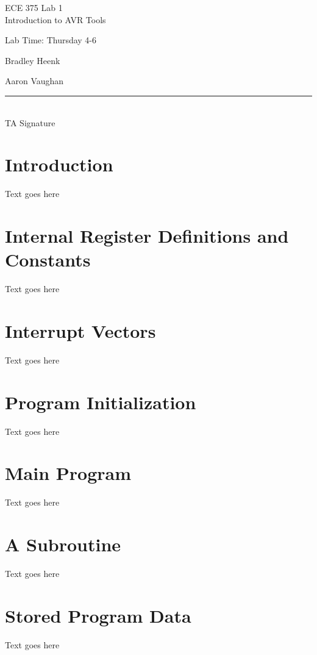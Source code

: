 \documentclass[12pt,letterpaper]{article}
\begin{document}
\begin{titlepage}
    \vspace*{4cm}
    \begin{flushright}
    {\huge
        ECE 375 Lab 1\\[1cm]
    }
    {\large
        Introduction to AVR Tools
    }
    \end{flushright}
    \begin{flushleft}
    Lab Time: Thursday 4-6
    \end{flushleft}
    \begin{flushright}
    Bradley Heenk

    Aaron Vaughan
    \vfill
    \rule{5in}{.5mm}\\
    TA Signature
    \end{flushright}

\end{titlepage}

\section{Introduction}
Text goes here

\section{Internal Register Definitions and Constants}
Text goes here

\section{Interrupt Vectors}
Text goes here

\section{Program Initialization}
Text goes here

\section{Main Program}
Text goes here

\section{A Subroutine}
Text goes here

\section{Stored Program Data}
Text goes here
\end{document}
